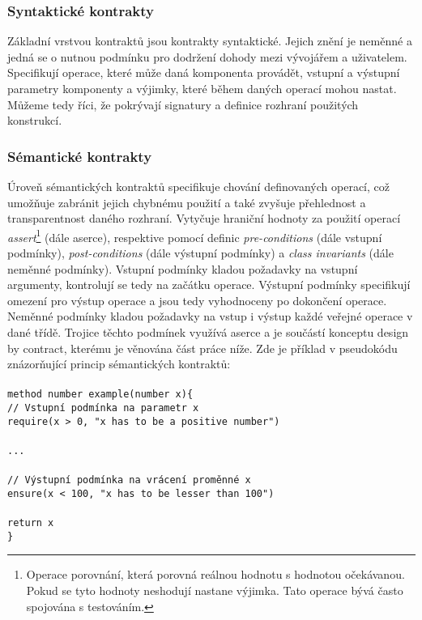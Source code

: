 		\subsubsection{Syntaktické kontrakty}
			Základní vrstvou kontraktů jsou kontrakty syntaktické. Jejich znění je neměnné a jedná se o nutnou podmínku pro dodržení dohody mezi vývojářem a uživatelem. Specifikují operace, které může daná komponenta provádět, vstupní a výstupní parametry komponenty a výjimky, které během daných operací mohou nastat. Můžeme tedy říci, že pokrývají signatury a definice rozhraní použitých konstrukcí. 
		
		\subsubsection{Sémantické kontrakty}
			Úroveň sémantických kontraktů specifikuje chování definovaných operací, což umožňuje zabránit jejich chybnému použití a také zvyšuje přehlednost a transparentnost daného rozhraní. Vytyčuje hraniční hodnoty za použití operací \emph{assert}\footnote{Operace porovnání, která porovná reálnou hodnotu s hodnotou očekávanou. Pokud se tyto hodnoty neshodují nastane výjimka. Tato operace bývá často spojována s testováním.} (dále aserce), respektive pomocí definic \emph{pre-conditions} (dále vstupní podmínky), \emph{post-conditions} (dále výstupní podmínky) a \emph{class invariants} (dále neměnné podmínky). Vstupní podmínky kladou požadavky na vstupní argumenty, kontrolují se tedy na začátku operace. Výstupní podmínky specifikují omezení pro výstup operace a jsou tedy vyhodnoceny po dokončení operace. Neměnné podmínky kladou požadavky na vstup i výstup každé veřejné operace v dané třídě. Trojice těchto podmínek využívá aserce a je součástí konceptu design by contract, kterému je věnována část práce níže. Zde je příklad v pseudokódu znázorňující princip sémantických kontraktů:\\\\
			\- \- \- \- \- \texttt{method number example(number x)\{}\\
			\- \- \- \- \- \- \- \- \- \- \texttt{\textcolor{pgrey}{// Vstupní podmínka na parametr x}}\\ 
        	\- \- \- \- \- \- \- \- \- \- \texttt{require(x > 0, "x has to be a positive number")}\\\\
        	\- \- \- \- \- \- \- \- \- \- \texttt{...}\\\\ 
        	\- \- \- \- \- \- \- \- \- \- \texttt{\textcolor{pgrey}{// Výstupní podmínka na vrácení proměnné x}}\\ 
        	\- \- \- \- \- \- \- \- \- \- \texttt{ensure(x < 100, "x has to be lesser than 100")}\\\\
			\- \- \- \- \- \- \- \- \- \- \texttt{return x}\\ 
    		\- \- \- \- \- \texttt{\}}\\
    		
